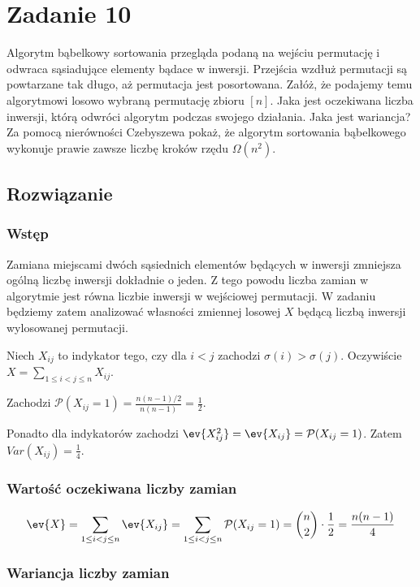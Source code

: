 \section{Zadanie 10}
Algorytm bąbelkowy sortowania przegląda podaną na wejściu permutację i odwraca sąsiadujące elementy bądace w inwersji. Przejścia wzdłuż permutacji są powtarzane tak długo, aż permutacja jest posortowana. Załóż, że podajemy temu algorytmowi losowo wybraną permutację zbioru \([n]\). Jaka jest oczekiwana liczba inwersji, którą odwróci algorytm podczas swojego działania. Jaka jest wariancja? Za pomocą nierówności Czebyszewa pokaż, że algorytm sortowania bąbelkowego wykonuje prawie zawsze liczbę kroków rzędu \(\Omega(n^2)\).

\subsection*{Rozwiązanie}

\subsubsection*{Wstęp}
Zamiana miejscami dwóch sąsiednich elementów będących w inwersji zmniejsza ogólną liczbę inwersji dokładnie o jeden. Z tego powodu liczba zamian w algorytmie jest równa liczbie inwersji w wejściowej permutacji. W zadaniu będziemy zatem analizować własności zmiennej losowej \(X\) będącą liczbą inwersji wylosowanej permutacji.

Niech \(X_{ij}\) to indykator tego, czy dla \(i < j\) zachodzi \(\sigma(i) > \sigma(j)\). Oczywiście \(X = \sum_{1 \le i < j \le n} X_{ij}\).

Zachodzi \(\mathcal{P}(X_{ij} = 1) = \frac{n(n-1)/2}{n(n-1)} = \frac{1}{2}\).

Ponadto dla indykatorów zachodzi \(\ev{X_{ij}^2} = \ev{X_{ij}} = \mathcal{P}(X_{ij} = 1)\). Zatem \(Var(X_{ij}) = \frac{1}{4}\).

\subsubsection*{Wartość oczekiwana liczby zamian}
\[
	\ev{X} = \sum_{1 \le i < j \le n} \ev{X_{ij}} = \sum_{1 \le i < j \le n} \mathcal{P}(X_{ij} = 1) = \binom{n}{2} \cdot \frac{1}{2} = \frac{n(n-1)}{4}
\]

\subsubsection*{Wariancja liczby zamian}

